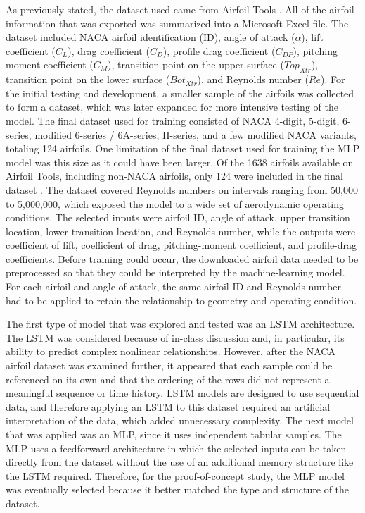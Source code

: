As previously stated, the dataset used came from Airfoil Tools \cite{airfoiltools}. All of the airfoil information that was exported was summarized into a Microsoft Excel file. The dataset included NACA airfoil identification (ID), angle of attack ($\alpha$), lift coefficient ($C_L$), drag coefficient ($C_D$), profile drag coefficient ($C_{DP}$), pitching moment coefficient ($C_M$), transition point on the upper surface ($Top_{Xtr}$), transition point on the lower surface ($Bot_{Xtr}$), and Reynolds number ($Re$). For the initial testing and development, a smaller sample of the airfoils was collected to form a dataset, which was later expanded for more intensive testing of the model. The final dataset used for training consisted of NACA 4-digit, 5-digit, 6-series, modified 6-series / 6A-series, H-series, and a few modified NACA variants, totaling 124 airfoils. One limitation of the final dataset used for training the MLP model was this size as it could have been larger. Of the 1638 airfoils available on Airfoil Tools, including non-NACA airfoils, only 124 were included in the final dataset \cite{airfoiltools}. The dataset covered Reynolds numbers on intervals ranging from 50{,}000 to 5{,}000{,}000, which exposed the model to a wide set of aerodynamic operating conditions. The selected inputs were airfoil ID, angle of attack, upper transition location, lower transition location, and Reynolds number, while the outputs were coefficient of lift, coefficient of drag, pitching-moment coefficient, and profile-drag coefficients. Before training could occur, the downloaded airfoil data needed to be preprocessed so that they could be interpreted by the machine-learning model. For each airfoil and angle of attack, the same airfoil ID and Reynolds number had to be applied to retain the relationship to geometry and operating condition.

The first type of model that was explored and tested was an LSTM architecture. The LSTM was considered because of in-class discussion and, in particular, its ability to predict complex nonlinear relationships. However, after the NACA airfoil dataset was examined further, it appeared that each sample could be referenced on its own and that the ordering of the rows did not represent a meaningful sequence or time history. LSTM models are designed to use sequential data, and therefore applying an LSTM to this dataset required an artificial interpretation of the data, which added unnecessary complexity. The next model that was applied was an MLP, since it uses independent tabular samples. The MLP uses a feedforward architecture in which the selected inputs can be taken directly from the dataset without the use of an additional memory structure like the LSTM required. Therefore, for the proof-of-concept study, the MLP model was eventually selected because it better matched the type and structure of the dataset.

